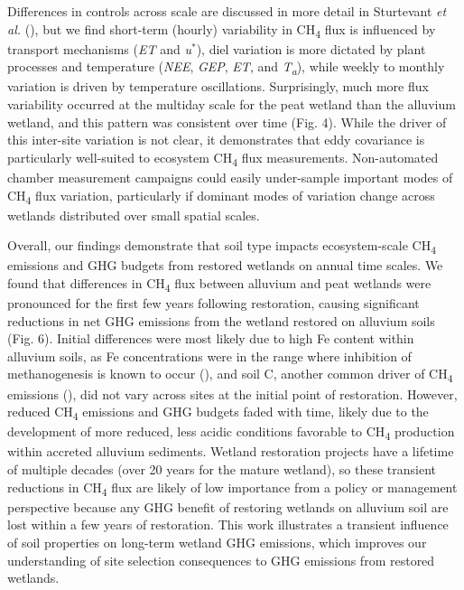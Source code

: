 \documentclass[
  12pt,
]{article}
\begin{document}
Differences in controls across scale are discussed in more detail in
Sturtevant \emph{et al.}
(), but we find
short-term (hourly) variability in CH\textsubscript{4} flux is
influenced by transport mechanisms (\emph{ET} and \emph{u\(^\ast\)}),
diel variation is more dictated by plant processes and temperature
(\emph{NEE}, \emph{GEP}, \emph{ET}, and \emph{T\textsubscript{a}}),
while weekly to monthly variation is driven by temperature oscillations.
Surprisingly, much more flux variability occurred at the multiday scale
for the peat wetland than the alluvium wetland, and this pattern was
consistent over time (Fig. 4). While the driver of this inter-site
variation is not clear, it demonstrates that eddy covariance is
particularly well-suited to ecosystem CH\textsubscript{4} flux
measurements. Non-automated chamber measurement campaigns could easily
under-sample important modes of CH\textsubscript{4} flux variation,
particularly if dominant modes of variation change across wetlands
distributed over small spatial scales.

Overall, our findings demonstrate that soil type impacts ecosystem-scale
CH\textsubscript{4} emissions and GHG budgets from restored wetlands on
annual time scales. We found that differences in CH\textsubscript{4}
flux between alluvium and peat wetlands were pronounced for the first
few years following restoration, causing significant reductions in net
GHG emissions from the wetland restored on alluvium soils (Fig. 6).
Initial differences were most likely due to high Fe content within
alluvium soils, as Fe concentrations were in the range where inhibition
of methanogenesis is known to occur
(), and soil
C, another common driver of CH\textsubscript{4} emissions
(), did not vary
across sites at the initial point of restoration. However, reduced
CH\textsubscript{4} emissions and GHG budgets faded with time, likely
due to the development of more reduced, less acidic conditions favorable
to CH\textsubscript{4} production within accreted alluvium sediments.
Wetland restoration projects have a lifetime of multiple decades (over
20 years for the mature wetland), so these transient reductions in
CH\textsubscript{4} flux are likely of low importance from a policy or
management perspective because any GHG benefit of restoring wetlands on
alluvium soil are lost within a few years of restoration. This work
illustrates a transient influence of soil properties on long-term
wetland GHG emissions, which improves our understanding of site
selection consequences to GHG emissions from restored wetlands.
\end{document}
